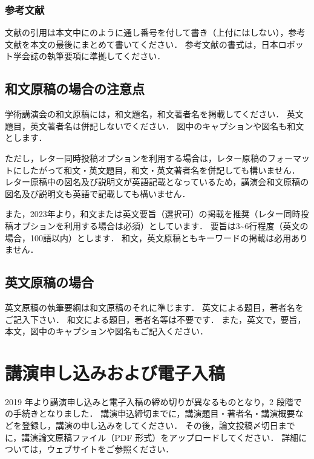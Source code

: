 \documentclass[twocolumn]{jarticle} %
\begin{document}
\subsubsection{参考文献}
文献の引用は本文中に\cite{website}\cite{yamada2000}のように通し番号を付して書き（上付にはしない），参考文献を本文の最後にまとめて書いてください．
参考文献の書式は，日本ロボット学会誌の執筆要項\cite{rsj_rules}に準拠してください．

\subsection{和文原稿の場合の注意点}
学術講演会の和文原稿には，和文題名，和文著者名を掲載してください．
英文題目，英文著者名は併記しないでください．
図中のキャプションや図名も和文とします．

ただし，レター同時投稿オプションを利用する場合は，レター原稿のフォーマットにしたがって和文・英文題目，和文・英文著者名を併記しても構いません．
レター原稿中の図名及び説明文が英語記載となっているため，講演会和文原稿の図名及び説明文も英語で記載しても構いません．

また，2023年より，和文または英文要旨（選択可）の掲載を推奨（レター同時投稿オプションを利用する場合は必須）としています．
要旨は3\textasciitilde6行程度（英文の場合，100語以内）とします．
和文，英文原稿ともキーワードの掲載は必用ありません．

\subsection{英文原稿の場合}
英文原稿の執筆要綱は和文原稿のそれに準じます．
英文による題目，著者名をご記入下さい．
和文による題目，著者名等は不要です．
また，英文で，要旨，本文，図中のキャプションや図名もご記入ください．

\section{講演申し込みおよび電子入稿}
2019 年より講演申し込みと電子入稿の締め切りが異なるものとなり，2 段階での手続きとなりました．
講演申込締切までに，講演題目・著者名・講演概要などを登録し，講演の申し込みをしてください．
その後，論文投稿〆切日までに，講演論文原稿ファイル（PDF 形式）をアップロードしてください．
詳細については，ウェブサイト\cite{website}をご参照ください．

\end{document}
